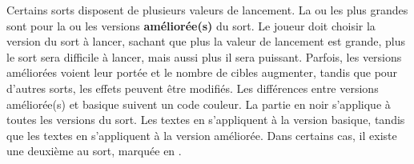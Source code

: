 \vspace*{10pt}
Certains sorts disposent de plusieurs valeurs de lancement. La ou les plus grandes sont pour la  ou les versions \textbf{améliorée(s)} du sort. Le joueur doit choisir la version du sort à lancer, sachant que plus la valeur de lancement est grande, plus le sort sera difficile à lancer, mais aussi plus il sera puissant. Parfois, les versions améliorées voient leur portée et le nombre de cibles augmenter, tandis que pour d'autres sorts, les effets peuvent être modifiés. Les différences entre versions améliorée(s) et basique suivent un code couleur. La partie en noir s'applique à toutes les versions du sort. Les textes en  s'appliquent à la version basique, tandis que les textes en  s'appliquent à la version améliorée. Dans certains cas, il existe une deuxième \augment{} au sort, marquée en . 



\tablelabels

\spelllabelandtitle{\attributespellnumber}{\alchemyattribute}

\tablespellcastingvalue{}
\tablespelltype{\hex}
\tablespellduration{\lastsoneturn}
\hline
{}

\tablespelltype{\hex\newline\missile\newline\damage}
\tablespellduration{\instant}
\hline
{}

\tablespelltype{\augment}
\tablespellduration{\lastsoneturn}
\hline
{}

\tablespelltype{\hex\newline\missile\newline\damage}
\tablespellduration{\instant}
\hline
{}


